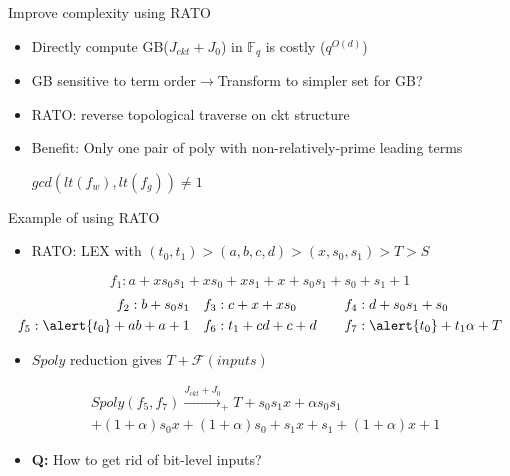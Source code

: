 \documentclass[xcolor=dvipsnames]{beamer}
\newcommand{\Fq}{{\mathbb{F}}_{q}}
\newcommand{\bi}{\begin{itemize}}
\newcommand{\ei}{\end{itemize}}
\newcommand{\Func}{{\mathcal{F}}}
\begin{document}
\begin{frame}{\large{Improve complexity using RATO}}
\bi
\item Directly compute GB($J_{ckt}+J_0$) in $\Fq$ is costly ($q^{O(d)}$)
\item GB sensitive to term order$\to$Transform to simpler set for GB?
\pause
\item RATO: reverse topological traverse on ckt structure
\item Benefit: Only one pair of poly with non-relatively-prime leading terms\par
$gcd(lt(f_w),lt(f_g))\neq 1$
\ei
\begin{figure}[H]
\end{figure}
\end{frame}
\begin{frame}{\large{Example of using RATO}}
\bi
\item RATO: LEX with $(t_0,t_1)>(a,b,c,d)>(x,s_0,s_1)>T>S$
\ei
\begin{equation*}
f_1: a+xs_0s_1+xs_0+xs_1+x+s_0s_1+s_0+s_1+1
\end{equation*}
\vspace{-0.8cm}
\begin{alignat*}{2}
f_2: b+s_0s_1 &~~~ f_3: c+x+xs_0 &&~~~f_4: d+s_0s_1+s_0 \\
f_5: \alert{t_0}+ab+a+1 &~~~ f_6: t_1+cd+c+d &&~~~ f_7: \alert{t_0}+t_1\alpha+T 
\end{alignat*}
\bi
\item $Spoly$ reduction gives $T+\Func(inputs)$
\ei
\begin{align}
&Spoly(f_5,f_7) \xrightarrow{J_{ckt}+J_0}_{+}T + s_0 s_1 x+\alpha s_0 s_1 \nonumber\\
&+(1+\alpha)s_0 x+(1+\alpha) s_0+s_1 x+s_1+(1+\alpha) x+1\nonumber
\end{align}
\bi
\item {\bf Q:} How to get rid of bit-level inputs?
\ei
\end{frame}
\end{document}

